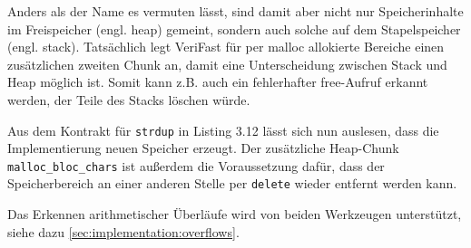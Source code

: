 Anders als der Name es vermuten lässt, sind damit aber nicht nur Speicherinhalte im Freispeicher (engl. heap) gemeint, 
sondern auch solche auf dem Stapelspeicher (engl. stack). Tatsächlich legt VeriFast für
per malloc allokierte Bereiche einen zusätzlichen zweiten Chunk an, damit eine Unterscheidung zwischen Stack und
Heap möglich ist. Somit kann z.B. auch ein fehlerhafter free-Aufruf erkannt werden, der Teile des Stacks löschen würde.



Aus dem Kontrakt für \texttt{strdup} in Listing 3.12 lässt sich nun auslesen, dass die Implementierung neuen Speicher
erzeugt. Der zusätzliche Heap-Chunk \lstinline{malloc_bloc_chars} ist außerdem die Voraussetzung dafür, dass der Speicherbereich
an einer anderen Stelle per \texttt{delete} wieder entfernt werden kann.

Das Erkennen arithmetischer Überläufe wird von beiden Werkzeugen unterstützt, siehe dazu \ref{sec:implementation:overflows}.



